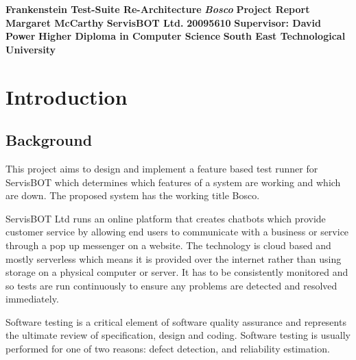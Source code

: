 \documentclass[12pt,a4paper,titlepage]{report}
\newcommand\AcademicTitle{Frankenstein Test-Suite Re-Architecture}
\newcommand\CommercialTitle{Bosco}
\newcommand\Author{Margaret McCarthy}
\newcommand\StudentID{20095610}
\newcommand\Report{Project Report}
\newcommand\Stakeholder{ServisBOT Ltd.}
\newcommand\Course{Higher Diploma in Computer Science}
\newcommand\Reader{Supervisor: David Power}
\newcommand\University{South East Technological University}
\begin{document}

\thispagestyle{empty}
\begin{center}
 \mbox{}\vfill
 {\fontsize{17pt}{20pt}\selectfont \bfseries \AcademicTitle}
 \vfill
 {\fontsize{14pt}{20pt}\selectfont \bfseries\itshape \CommercialTitle}
 \vfill
 {\fontsize{12pt}{20pt}\selectfont \bfseries \Report}
 \vfill
 {\fontsize{14pt}{20pt}\selectfont \bfseries \Author}
 \vfill
 {\fontsize{14pt}{20pt}\selectfont \bfseries \Stakeholder}
 \vfill
 {\fontsize{14pt}{20pt}\selectfont \bfseries \StudentID}
 \vfill
 {\fontsize{14pt}{20pt}\selectfont \bfseries \Reader}
 \vfill
 {\fontsize{14pt}{20pt}\selectfont \bfseries \Course}
 \vfill
 {\fontsize{14pt}{20pt}\selectfont \bfseries \University}
 \vfill
\end{center}
\clearpage

\tableofcontents

\listoftables

\listoffigures

\clearpage
{}
\setcounter{page}{1}

\chapter{Introduction}

\section{Background}

This project aims to design and implement a feature based test runner for ServisBOT which determines which features of a system are working and which are down. The proposed system has the working title Bosco.

ServisBOT Ltd runs an online platform that creates chatbots which provide customer service by allowing end users to communicate with a business or service through a pop up messenger on a website. The technology is cloud based and mostly serverless which means it is provided over the internet rather than using storage on a physical computer or server. It has to be consistently monitored and so tests are run continuously to ensure any problems are detected and resolved immediately. 

Software testing is a critical element of software quality assurance and represents the ultimate review of specification, design and coding. Software testing is usually performed for one of two reasons: defect detection, and reliability estimation. \cite{Ahamed}
\end{document}
